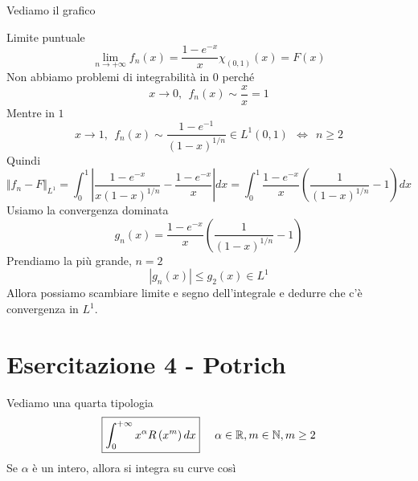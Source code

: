 Vediamo il grafico


Limite puntuale
\begin{equation*}
\lim\limits_{n\rightarrow + \infty} f_{n}(x) = \frac{1 - e^{- x}}{x} \chi_{(0, 1)} (x) = F(x)
\end{equation*}
Non abbiamo problemi di integrabilità in $0$ perché
\begin{equation*}
x\rightarrow 0, \ \ f_{n}(x) \sim \frac{x}{x} = 1
\end{equation*}
Mentre in $1$
\begin{equation*}
x\rightarrow 1, \ \ f_{n}(x) \sim \frac{1 - e^{- 1}}{(1 - x)^{1/n}} \in L^{1}(0, 1) \ \ \iff \ \ n \geq 2
\end{equation*}
Quindi
\begin{equation*}
\Vert f_{n} - F\Vert_{L^{1}} = \int^{1}_{0}\left| \frac{1 - e^{- x}}{x(1 - x)^{1/n}} - \frac{1 - e^{- x}}{x}\right| dx = \int^{1}_{0}\frac{1 - e^{- x}}{x}\left(\frac{1}{(1 - x)^{1/n}} - 1\right) dx
\end{equation*}
Usiamo la convergenza dominata
\begin{equation*}
g_{n}(x) = \frac{1 - e^{- x}}{x}\left(\frac{1}{(1 - x)^{1/n}} - 1\right)
\end{equation*}
Prendiamo la più grande, $n = 2$
\begin{equation*}
| g_{n}(x)| \leq g_{2}(x) \in L^{1}
\end{equation*}
Allora possiamo scambiare limite e segno dell'integrale e dedurre che c'è convergenza in $L^{1}$.
\chapter{Esercitazione 4 - Potrich}
\ParteEsercizi
\Esercizio{}

Vediamo una quarta tipologia
\begin{equation*}
\boxed{\int^{+ \infty}_{0} x^{\alpha} R\left(x^{m}\right) dx} \ \ \ \ \alpha \in \mathbb{R}, m\in \mathbb{N}, m \geq 2
\end{equation*}
Se $\alpha $ è un intero, allora si integra su curve così


